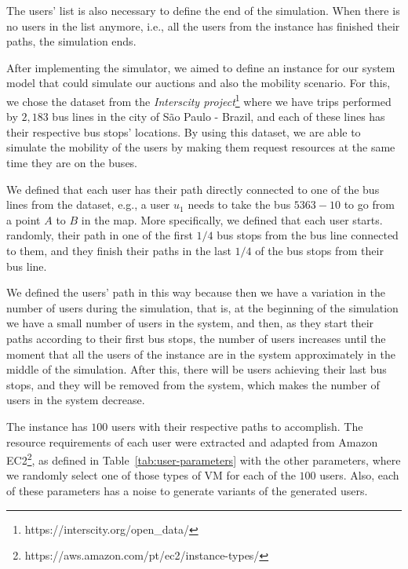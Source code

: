 \documentclass[English]{ic-tese-v3}
\begin{document}
The users' list is also necessary to define the end of the simulation. When there is no users in the list anymore, i.e., all the users from the instance has finished their paths, the simulation ends.

After implementing the simulator, we aimed to define an instance for our system model that could simulate our auctions and also the mobility scenario. For this, we chose the dataset from the \emph{Interscity project}\footnote{https://interscity.org/open\_data/} where we have trips performed by $2,183$ bus lines in the city of São Paulo - Brazil, and each of these lines has their respective bus stops' locations. By using this dataset, we are able to simulate the mobility of the users by making them request resources at the same time they are on the buses.

We defined that each user has their path directly connected to one of the bus lines from the dataset, e.g., a user $u_1$ needs to take the bus $5363-10$ to go from a point $A$ to $B$ in the map. More specifically, we defined that each user starts. randomly, their path in one of the first $1/4$ bus stops from the bus line connected to them, and they finish their paths in the last $1/4$ of the bus stops from their bus line.

We defined the users' path in this way because then we have a variation in the number of users during the simulation, that is, at the beginning of the simulation we have a small number of users in the system, and then, as they start their paths according to their first bus stops, the number of users increases until the moment that all the users of the instance are in the system approximately in the middle of the simulation. After this, there will be users achieving their last bus stops, and they will be removed from the system, which makes the number of users in the system decrease.

The instance has $100$ users with their respective paths to accomplish. The resource requirements of each user were extracted and adapted from Amazon EC2\footnote{https://aws.amazon.com/pt/ec2/instance-types/}, as defined in Table~\ref{tab:user-parameters} with the other parameters, where we randomly select one of those types of VM for each of the $100$ users. Also, each of these parameters has a noise to generate variants of the generated users.
\end{document}
